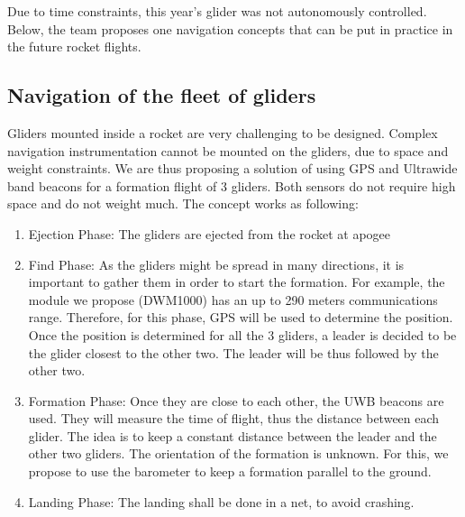 Due to time constraints, this year's glider was not autonomously controlled. Below, the team proposes one navigation concepts that can be put in practice in the future rocket flights.


\subsection{Navigation of the fleet of gliders}
\label{subsection:navcontrol}

Gliders mounted inside a rocket are very challenging to be designed. 
Complex navigation instrumentation cannot be mounted on the gliders, due to space and weight constraints. 
We are thus proposing a solution of using GPS and Ultrawide band beacons for a formation flight of 3 gliders. Both sensors do not require high space and do not weight much.
The concept works as following:
\begin{enumerate}
    \item Ejection Phase: The gliders are ejected from the rocket at apogee
    \item Find Phase: As the gliders might be spread in many directions, it is important to gather them in order to start the formation. For example, the module we propose (DWM1000) has an up to 290 meters communications range. Therefore, for this phase, GPS will be used to determine the position. Once the position is determined for all the 3 gliders, a leader is decided to be the glider closest to the other two. The leader will be thus followed by the other two.
    \item Formation Phase: Once they are close to each other, the UWB beacons are used. They will measure the time of flight, thus the distance between each glider. The idea is to keep a constant distance between the leader and the other two gliders. The orientation of the formation is unknown. For this, we propose to use the barometer to keep a formation parallel to the ground. 
    \item Landing Phase: The landing shall be done in a net, to avoid crashing.
\end{enumerate}









